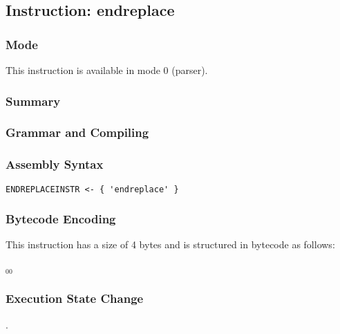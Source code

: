 \subsection{Instruction: endreplace}

\subsubsection{Mode}
This instruction is available in mode 0 (parser).
\subsubsection{Summary}


\subsubsection{Grammar and Compiling}


\subsubsection{Assembly Syntax}

\begin{myquote}
\begin{verbatim}
ENDREPLACEINSTR <- { 'endreplace' }
\end{verbatim}
\end{myquote}

\subsubsection{Bytecode Encoding}

This instruction has a size of 4 bytes and is structured in bytecode as follows:

$_{00}$\ 

\subsubsection{Execution State Change}

.


